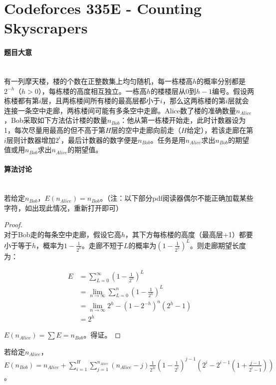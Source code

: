 \documentclass[UTF8]{ctexart}
\newcommand{\myparagraph}[1]{\paragraph{#1}\mbox{}\\}
\theoremstyle{nonumberplain}
\newtheorem{proof}{\hspace{1em}证明：}
\begin{document}
	\section{Codeforces 335E - Counting Skyscrapers}
	
		\myparagraph{题目大意}
		
			有一列摩天楼，楼的个数在正整数集上均匀随机，每一栋楼高$h$的概率分别都是$2^{-h}$（$h>0$），每栋楼的高度相互独立。一栋高$h$的楼楼层从0到$h-1$编号。假设两栋楼都有第$i$层，且两栋楼间所有楼的最高层都小于$i$，那么这两栋楼的第$i$层就会连接一条空中走廊，两栋楼间可能有多条空中走廊。Alice数了楼的准确数量$n_{Alice}$，Bob采取如下方法估计楼的数量$n_{Bob}$：他从第一栋楼开始走，此时计数器设为1，每次尽量用最高的但不高于第$H$层的空中走廊向前走（$H$给定），若该走廊在第$i$层则计数器增加$2^i$，最后计数器的数字便是$n_{Bob}$。任务是用$n_{Alice}$求出$n_{Bob}$的期望值或用$n_{Bob}$求出$n_{Alice}$的期望值。
		
		\myparagraph{算法讨论}
			
			若给定$n_{Bob}$，$E(n_{Alice})=n_{Bob}$。（注：以下部分pdf阅读器偶尔不能正确加载某些字符，如出现此情况，重新打开即可）
			
			\begin{proof}\mbox{}\\
			
				对于Bob走的每条空中走廊，假设它高$h$，其下方每栋楼的高度（最高层+1）都要小于等于$h$，概率为$1-\frac{1}{2^h}$。走廊不短于$L$的概率为$(1-\frac{1}{2^h})^L$。则走廊期望长度为：
				
				$$\begin{aligned}
					E&=\sum_{L=0}^\infty(1-\frac{1}{2^h})^L\\
					 &=\lim_{n \to \infty} \sum_{L=0}^n(1-\frac{1}{2^h})^L\\
					 &=\lim_{n \to \infty} 2^h-(1-2^{-h})^n(2^h-1)\\
					 &=2^h
				\end{aligned}$$
				
				$E(n_{Alice})=\sum E=n_{Bob}$。得证。
			
			\end{proof}
			
			若给定$n_{Alice}$，$E(n_{Bob})=n_{Alice}+\sum_{i=1}^{H}\sum_{j=1}^{n_{Alice}}(n_{Alice}-j)\frac{1}{2^{2i}}(1-\frac{1}{2^i})^{j-1}(2^i-2^{i-1}(1+\frac{j-1}{2^i-1}))$。
			
\end{document}
